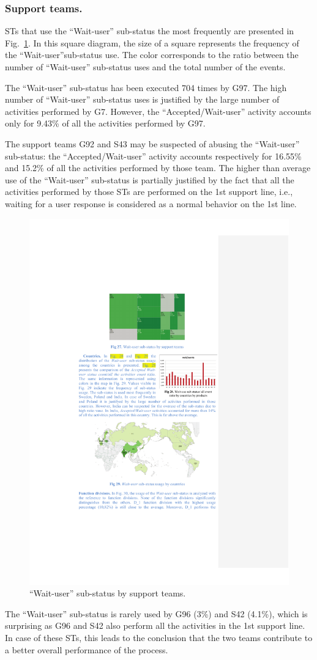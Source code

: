 \documentclass[lnbip]{svmultln}
\begin{document}
\subsubsection{Support teams.}
STs that use the ``Wait-user'' sub-status the most frequently are presented in Fig.~\ref{fig:waitUseST}. In this square diagram, the size of a square represents the frequency of the ``Wait-user''sub-status use. The color corresponds to the ratio between the number of ``Wait-user'' sub-status uses and the total number of the events. 

The ``Wait-user'' sub-status has been executed 704 times by G97. The high number of ``Wait-user'' sub-status uses is justified by the large number of activities performed by G7. However, the ``Accepted/Wait-user'' activity accounts only for 9.43\% of all the activities performed by G97. 

The support teams G92 and S43 may be suspected of abusing the ``Wait-user'' sub-status: the ``Accepted/Wait-user'' activity accounts respectively for 16.55\% and 15.2\% of all the activities performed by those team. The higher than average use of the ``Wait-user'' sub-status is partially justified by the fact that all the activities performed by those STs are performed on the 1st support line, i.e., waiting for a user response is considered as a normal behavior on the 1st line. 
\begin{figure}
  \vspace{-20pt}
  \begin{center}
    \includegraphics[width=.6\textwidth]{"figs/pic 29"}
  \end{center}
  \vspace{-10pt}
  \caption{``Wait-user'' sub-status by support teams.}
  \label{fig:waitUseST}
  \vspace{-25pt}
\end{figure}
The ``Wait-user'' sub-status is rarely used by G96 (3\%) and S42 (4.1\%), which is surprising as G96 and S42 also perform all the activities in the 1st support line. In case of these STs, this leads to the conclusion that the two teams contribute to a better overall performance of the process.
 
\end{document}
